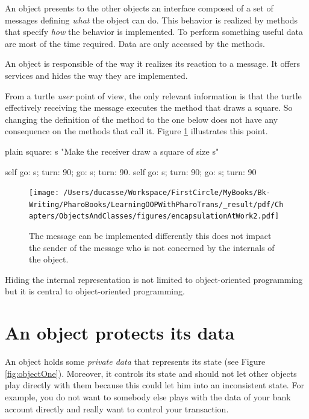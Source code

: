 \documentclass[10pt,twoside,english]{_support/latex/sbabook/sbabook}
\begin{document}
\begin{important}
An object presents to the other objects an interface composed of a set of messages defining \textit{what} the object can do. This behavior is realized by methods that specify \textit{how} the behavior is implemented. To perform something useful data are most of the time required. Data are only accessed by the methods.
\end{important}

\begin{important}
An object is responsible of the way it realizes its reaction to a message. It offers services and hides the way they are implemented.
\end{important}

From a turtle \textit{user} point of view, the only relevant information is that the turtle effectively receiving the message  executes the method that draws a square. So changing the definition of the  method  to the one below does not have any consequence on the methods that call it. Figure \ref{fig:encapsulationAtWork2} illustrates this point.

\begin{displaycode}{plain}
square: s
   "Make the receiver draw a square of size s"

   self go: s; turn: 90; go: s; turn: 90.
   self go: s; turn: 90; go: s; turn: 90
\end{displaycode}


\begin{figure}

\begin{center}
\texttt{[image: /Users/ducasse/Workspace/FirstCircle/MyBooks/Bk-Writing/PharoBooks/LearningOOPWithPharoTrans/\_result/pdf/Chapters/ObjectsAndClasses/figures/encapsulationAtWork2.pdf]}\caption{The message  can be implemented differently this does not impact the sender of the message who is not concerned by the internals of the object.\label{fig:encapsulationAtWork2}}\end{center}
\end{figure}


Hiding the internal representation is not limited to object-oriented programming but it is central to object-oriented programming. 
\section{An object protects its data}
An object holds some \textit{private data} that represents its state (see Figure \ref{fig:objectOne}). Moreover, it controls its state and should not let other objects play directly with them because this could let him into an inconsistent state.  For example, you do not want to somebody else plays with the data of your bank account directly and really want to control your transaction. 
\end{document}
